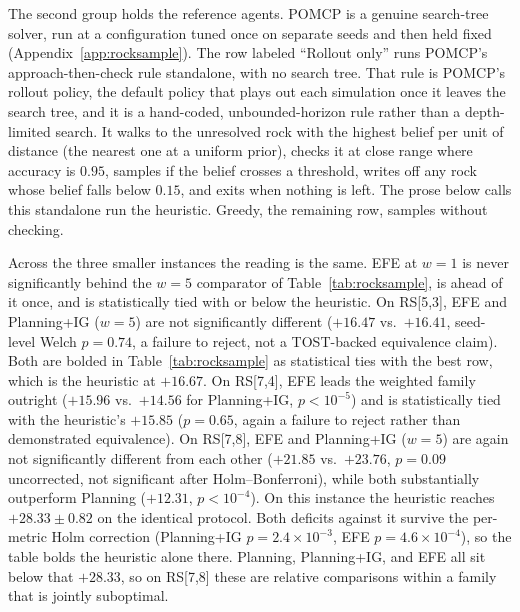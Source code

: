 The second group holds the reference agents. POMCP is a genuine search-tree solver, run at a configuration tuned once on separate seeds and then held fixed (Appendix~\ref{app:rocksample}). The row labeled ``Rollout only'' runs POMCP's approach-then-check rule standalone, with no search tree. That rule is POMCP's rollout policy, the default policy that plays out each simulation once it leaves the search tree, and it is a hand-coded, unbounded-horizon rule rather than a depth-limited search. It walks to the unresolved rock with the highest belief per unit of distance (the nearest one at a uniform prior), checks it at close range where accuracy is $0.95$, samples if the belief crosses a threshold, writes off any rock whose belief falls below $0.15$, and exits when nothing is left. The prose below calls this standalone run the heuristic. Greedy, the remaining row, samples without checking.



Across the three smaller instances the reading is the same. EFE at $w{=}1$ is never significantly behind the $w{=}5$ comparator of Table~\ref{tab:rocksample}, is ahead of it once, and is statistically tied with or below the heuristic. On RS[5,3], EFE and Planning+IG ($w{=}5$) are not significantly different ($+16.47$ vs.\ $+16.41$, seed-level Welch $p{=}0.74$, a failure to reject, not a TOST-backed equivalence claim). Both are bolded in Table~\ref{tab:rocksample} as statistical ties with the best row, which is the heuristic at $+16.67$. On RS[7,4], EFE leads the weighted family outright ($+15.96$ vs.\ $+14.56$ for Planning+IG, $p<10^{-5}$) and is statistically tied with the heuristic's $+15.85$ ($p{=}0.65$, again a failure to reject rather than demonstrated equivalence). On RS[7,8], EFE and Planning+IG ($w{=}5$) are again not significantly different from each other ($+21.85$ vs.\ $+23.76$, $p{=}0.09$ uncorrected, not significant after Holm--Bonferroni), while both substantially outperform Planning ($+12.31$, $p<10^{-4}$). On this instance the heuristic reaches $+28.33 \pm 0.82$ on the identical protocol. Both deficits against it survive the per-metric Holm correction (Planning+IG $p{=}2.4{\times}10^{-3}$, EFE $p{=}4.6{\times}10^{-4}$), so the table bolds the heuristic alone there. Planning, Planning+IG, and EFE all sit below that $+28.33$, so on RS[7,8] these are relative comparisons within a family that is jointly suboptimal.

